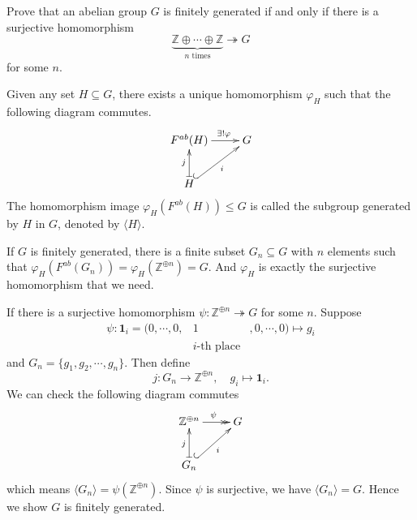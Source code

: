 \documentclass[12pt,letterpaper,boxed]{hmcpset}
\newcommand{\Z}{\mathbb{Z}}
\begin{document}
\begin{problem}[6.8]
	Prove that an abelian group $G$ is finitely generated if and only if there is a surjective homomorphism
	\[
	\underbrace{\Z\oplus\cdots\oplus\Z}_{n \text{ times}}\twoheadrightarrow G
	\]	
	for some $n$.
\end{problem}
\begin{solution}
	Given any set $H\subseteq G$, there exists a unique homomorphism $\varphi_H$ such that the following diagram commutes. 	
	\[\xymatrix{
		F^{ab}(H)\ar[r]^{\quad\exists!\varphi} & G\\
		H\ar@{^{(}->}[ru]_{i}\ar@{|->}[u]^{j}  
	}\]
	The  homomorphism image $\varphi_H(F^{ab}(H))\le G$ is called the subgroup generated by $H$ in $G$, denoted by $\langle H\rangle$. 
	
	If $G$ is finitely generated, there is a finite subset $G_n\subseteq G$ with $n$ elements such that $\varphi_H(F^{ab}(G_n))=\varphi_H(\Z^{\oplus n})=G$. And $\varphi_H$ is exactly the surjective homomorphism that we need. 
	
	If there is a surjective homomorphism $\psi:\Z^{\oplus n}\twoheadrightarrow G$ for some $n$. Suppose
	\[
	\begin{matrix}
		\psi:\mathbf{1}_i=(0,\cdots,0,&1&,0,\cdots,0)\longmapsto g_i\\
		            &i\text{-th place}&
	\end{matrix}
	\]
	and $G_n=\{g_1,g_2,\cdots,g_n\}$. Then define
	\[
	j:G_n\longrightarrow \Z^{\oplus n},\quad g_i\longmapsto\mathbf{1}_i.
	\]
	We can check the following diagram commutes
	\[\xymatrix{
		\Z^{\oplus n}\ar@{->>}[r]^{\psi} & G\\
		G_n\ar@{^{(}->}[ru]_{i}\ar@{|->}[u]^{j}  
	}\]
	which means $\langle G_n\rangle=\psi(\Z^{\oplus n})$. Since $\psi$ is surjective, we have $\langle G_n\rangle=G$. Hence we show $G$ is finitely generated.
\end{solution}
\end{document}
